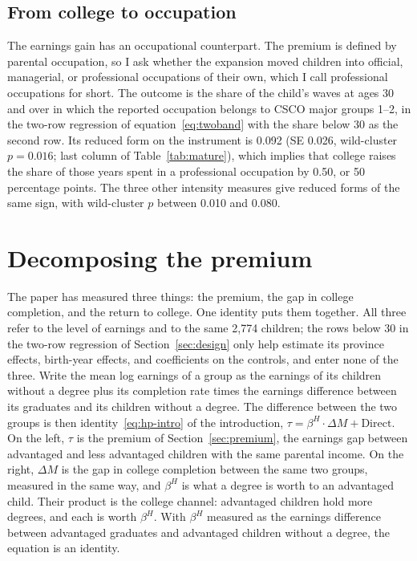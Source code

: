 \documentclass[11pt]{article}
\begin{document}
\subsection{From college to occupation}
\label{sec:occupation}

The earnings gain has an occupational counterpart. The premium is
defined by parental occupation, so I ask whether the expansion moved
children into official, managerial, or professional occupations of
their own, which I call professional occupations for short. The outcome
is the share of the child's waves at ages 30 and over in which the
reported occupation belongs to CSCO major groups 1--2, in the two-row
regression of equation~\eqref{eq:twoband} with the share below 30 as
the second row. Its reduced form on the instrument is 0.092 (SE
0.026, wild-cluster $p = 0.016$; last column of
Table~\ref{tab:mature}), which implies that college raises the share of those
years spent in a professional occupation by 0.50, or 50 percentage
points. The three other intensity measures give reduced forms of the
same sign, with wild-cluster $p$ between 0.010 and 0.080.

\section{Decomposing the premium}
\label{sec:mediation}

The paper has measured three things: the
premium, the gap in college completion, and the return to college. One
identity puts them together. All three refer to the level of earnings and to the same 2,774 children; the rows below 30 in the two-row regression of Section~\ref{sec:design} only help estimate its province effects, birth-year effects, and coefficients on the controls, and enter none of the three. Write the mean log earnings of a group as
the earnings of its children without a degree plus its completion rate
times the earnings difference between its graduates and its
children without a degree. The difference between the two groups is then
identity~\eqref{eq:hp-intro} of the introduction,
$\tau = \beta^{H} \cdot \Delta M + \mathrm{Direct}$. On the left,
$\tau$ is the premium of Section~\ref{sec:premium}, the earnings gap
between advantaged and less advantaged children with the same parental
income. On the right, $\Delta M$ is the gap in college completion
between the same two groups, measured in the same way, and $\beta^{H}$ is what a degree is
worth to an advantaged child. Their product is the college channel:
advantaged children hold more degrees, and each is worth
$\beta^{H}$. With $\beta^{H}$ measured as the earnings difference between advantaged graduates and advantaged children without a degree, the equation is an identity.
\end{document}
